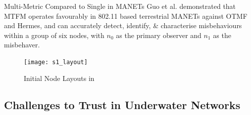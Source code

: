 \documentclass{beamer}
\begin{document}
\begin{frame}{Multi-Metric Compared to Single in MANETs}
  Guo et al.\autocite{Guo11} demonstrated that MTFM operates favourably in 802.11 based terrestrial MANETs against OTMF and Hermes, and can accurately detect, identify, \& characterise misbehaviours within a group of six nodes, with $n_0$ as the primary observer and $n_1$ as the misbehaver.

  \begin{figure}[h]
    \begin{center}
      \texttt{[image: s1\_layout]}
    \end{center}
    \caption{Initial Node Layouts in \autocite{Guo11}}
    \label{fig:node_layout}
  \end{figure}
  \end{frame}

\subsection{Challenges to Trust in Underwater Networks}
\end{document}
